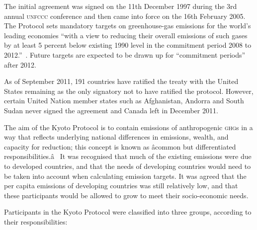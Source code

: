 The initial agreement was signed on the 11th December 1997 during the 3rd annual \textsc{unfccc} conference and then came into force on the 16th February 2005. The Protocol sets mandatory targets on greenhouse-gas emissions for the world's leading economies ``with a view to reducing their overall emissions of such gases by at least 5 percent below existing 1990 level in the commitment period 2008 to 2012.''~\cite{UNFCCC-98-p1}. Future targets are expected to be drawn up for ``commitment periods'' after 2012.~\cite{UNFCCC-98-p4}

As of September 2011, 191 countries have ratified the treaty with the United States remaining as the only signatory not to have ratified the protocol. However, certain United Nation member states such as Afghanistan, Andorra and South Sudan never signed the agreement and Canada left in December 2011.

The aim of the Kyoto Protocol is to contain emissions of anthropogenic \textsc{ghg}s in a way that reflects underlying national differences in emissions, wealth, and capacity for reduction; this concept is known as âcommon but differentiated responsibilities.â~\cite{Grubb-04}\cite{UNFCCC-92} It was recognised that much of the existing \CO emissions were due to developed countries, and that the needs of developing countries would need to be taken into account when calculating emission targets. It was agreed that the per capita emissions of developing countries was still relatively low, and that these participants would be allowed to grow to meet their socio-economic needs.

Participants in the Kyoto Protocol were classified into three groups, according to their responsibilities:~\cite{UNFCCC-92}

